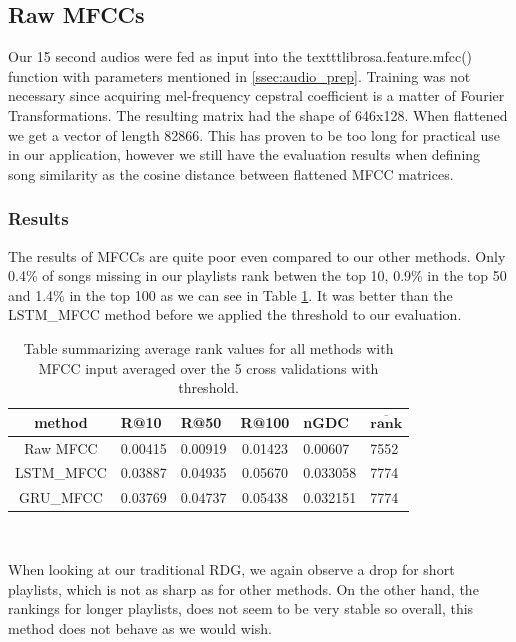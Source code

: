 \subsection{Raw MFCCs}
Our 15 second audios were fed as input into the texttt{librosa.feature.mfcc()} function with parameters mentioned in \ref{ssec:audio_prep}. Training was not necessary since acquiring mel-frequency cepstral coefficient is a matter of Fourier Transformations. The resulting matrix had the shape of 646x128. When flattened we get a vector of length 82866. This has proven to be too long for practical use in our application, however we still have the evaluation results when defining song similarity as the cosine distance between flattened MFCC matrices.

\subsubsection{Results}

The results of MFCCs are quite poor even compared to our other methods. Only 0.4\% of songs missing in our playlists rank betwen the top 10, 0.9\% in the top 50 and 1.4\% in the top 100 as we can see in Table \ref{table:mfcc_methods}. It was better than the LSTM\_MFCC method before we applied the threshold to our evaluation.
\begin{table}[h]
\centering
\renewcommand{\arraystretch}{1.5}
\begin{tabu} to 1\textwidth { | c || X[c] | X[c] | c | X[c] | X[c] |}
 \hline
 \textbf{method} & \textbf{R@10} & \textbf{R@50} & \textbf{R@100} & \textbf{nGDC} & $ \boldsymbol{\overline{rank}} $ \\
 \hline
 \hline
 Raw MFCC & 0.00415 & 0.00919 & 0.01423 & 0.00607 &  7552 \\
 \hline
 LSTM\_MFCC & 0.03887 & 0.04935 & 0.05670 & 0.033058 & 7774 \\
 \hline
 GRU\_MFCC & 0.03769 & 0.04737 & 0.05438 & 0.032151 & 7774 \\
 \hline
\end{tabu} \\

\caption{Table summarizing average rank values for all methods with MFCC input averaged over the 5 cross validations with threshold.}
\label{table:mfcc_methods}
\end{table}

 When looking at our traditional RDG, we again observe a drop for short playlists, which is not as sharp as for other methods. On the other hand, the rankings for longer playlists, does not seem to be very stable so overall, this method does not behave as we would wish.
 
